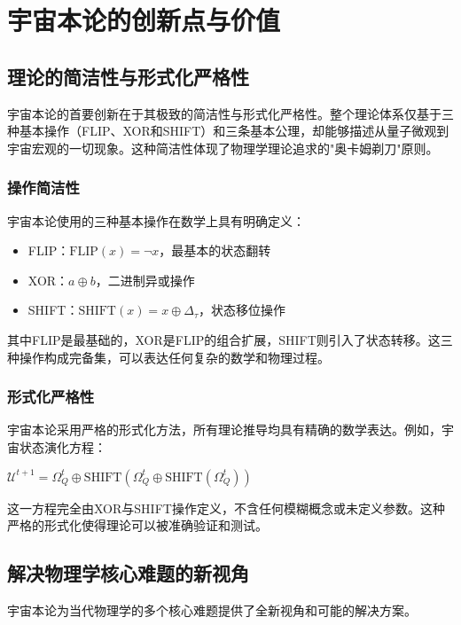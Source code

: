 \chapter{宇宙本论的创新点与价值}

\section{理论的简洁性与形式化严格性}

宇宙本论的首要创新在于其极致的简洁性与形式化严格性。整个理论体系仅基于三种基本操作（FLIP、XOR和SHIFT）和三条基本公理，却能够描述从量子微观到宇宙宏观的一切现象。这种简洁性体现了物理学理论追求的"奥卡姆剃刀"原则。

\subsection{操作简洁性}

宇宙本论使用的三种基本操作在数学上具有明确定义：

\begin{itemize}
  \item FLIP：$\text{FLIP}(x) = \neg x$，最基本的状态翻转
  \item XOR：$a \oplus b$，二进制异或操作
  \item SHIFT：$\text{SHIFT}(x) = x \oplus \Delta_{\tau}$，状态移位操作
\end{itemize}

其中FLIP是最基础的，XOR是FLIP的组合扩展，SHIFT则引入了状态转移。这三种操作构成完备集，可以表达任何复杂的数学和物理过程。

\subsection{形式化严格性}

宇宙本论采用严格的形式化方法，所有理论推导均具有精确的数学表达。例如，宇宙状态演化方程：

$\mathcal{U}^{t+1} = \Omega_Q^{t}\oplus\text{SHIFT}(\Omega_Q^{t}\oplus\text{SHIFT}(\Omega_Q^{t}))$

这一方程完全由XOR与SHIFT操作定义，不含任何模糊概念或未定义参数。这种严格的形式化使得理论可以被准确验证和测试。

\section{解决物理学核心难题的新视角}

宇宙本论为当代物理学的多个核心难题提供了全新视角和可能的解决方案。

